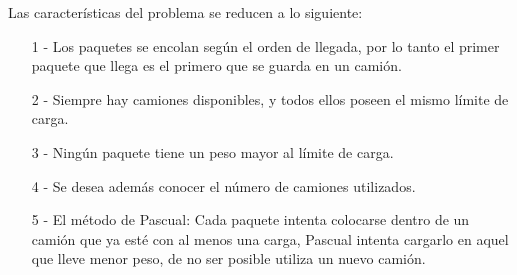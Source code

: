 Las caracter\'isticas del problema se reducen a lo siguiente:
\begin{itemize}
\item[1]- Los paquetes se encolan seg\'un el orden de llegada, por lo tanto el primer paquete que llega es el primero que se guarda en un cami\'on.
\item[2]- Siempre hay camiones disponibles, y todos ellos poseen el mismo l\'imite de carga.
\item[3]- Ning\'un paquete tiene un peso mayor al l\'imite de carga.
\item[4]- Se desea adem\'as conocer el n\'umero de camiones utilizados.
\item[5]- El m\'etodo de Pascual:
 Cada paquete intenta colocarse dentro de un cami\'on que ya est\'e con al menos una carga, Pascual intenta cargarlo en aquel que lleve menor peso, de no ser posible utiliza un nuevo cami\'on.
\end{itemize}